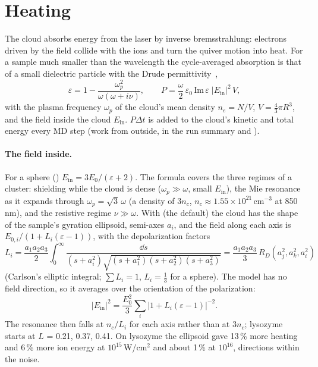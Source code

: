 \section{Heating}
\label{sec:heating}

The cloud absorbs energy from the laser by inverse bremsstrahlung: electrons driven by the field collide with the ions
and turn the quiver motion into heat.
For a sample much smaller than the wavelength the cycle-averaged absorption is that of a small dielectric particle with
the Drude permittivity~\cite{ditmire1996},
\begin{equation}
  \varepsilon = 1 - \frac{\omega_p^2}{\omega(\omega+i\nu)},\qquad
  P = \frac{\omega}{2}\,\varepsilon_0\,\mathrm{Im}\,\varepsilon\;|E_{\mathrm{in}}|^2\,V,
\end{equation}
with the plasma frequency $\omega_p$ of the cloud's mean density $n_e = N/V$, $V = \frac43\pi R^3$, and the field inside
the cloud $E_{\mathrm{in}}$.
$P\Delta t$ is added to the cloud's kinetic and total energy every MD step (work from outside,  in
the run summary and ).

\paragraph{The field inside.}
For a sphere () $E_{\mathrm{in}} = 3E_0/(\varepsilon+2)$.
The formula covers the three regimes of a cluster: shielding while the cloud is dense ($\omega_p\gg\omega$, small
$E_{\mathrm{in}}$), the Mie resonance as it expands through $\omega_p = \sqrt3\,\omega$ (a density of $3n_c$,
$n_c\approx1.55\times10^{21}$\,cm$^{-3}$ at 850\,nm), and the resistive regime $\nu\gg\omega$.
With  (the default) the cloud has the shape of the sample's gyration ellipsoid,
semi-axes $a_i$, and the field along each axis is $E_{0,i}/(1+L_i(\varepsilon-1))$, with the depolarization factors
\begin{equation}
  L_i = \frac{a_1a_2a_3}{2}\int_0^\infty\frac{\dd s}{(s+a_i^2)\sqrt{(s+a_1^2)(s+a_2^2)(s+a_3^2)}}
      = \frac{a_1a_2a_3}{3}\,R_D(a_j^2,a_k^2,a_i^2)
\end{equation}
(Carlson's elliptic integral; $\sum L_i = 1$, $L_i = \frac13$ for a sphere).
The model has no field direction, so it averages over the orientation of the polarization:
\begin{equation}
  |E_{\mathrm{in}}|^2 = \frac{E_0^2}{3}\sum_i\big|1+L_i(\varepsilon-1)\big|^{-2}.
\end{equation}
The resonance then falls at $n_c/L_i$ for each axis rather than at $3n_c$; lysozyme starts at $L$ = 0.21, 0.37, 0.41.
On lysozyme the ellipsoid gave 13\,\% more heating and 6\,\% more ion energy at $10^{15}$\,W/cm$^2$ and about 1\,\% at
$10^{16}$, directions within the noise.

